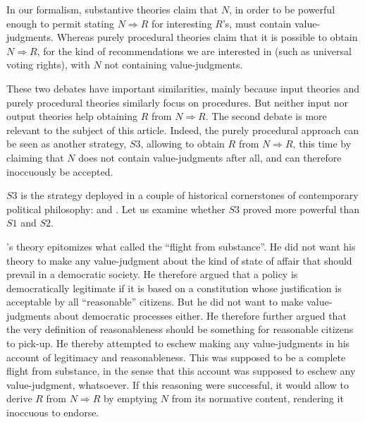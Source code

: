 \documentclass[preprint, french, english, 11pt, authoryear]{elsarticle}%
\begin{document}
In our formalism, substantive theories claim that $N$, in order to be powerful enough to permit stating $N ⇒ R$ for interesting $R$’s, must contain value-judgments. Whereas purely procedural theories claim that it is possible to obtain $N ⇒ R$, for the kind of recommendations we are interested in (such as universal voting rights), with $N$ not containing value-judgments. 

These two debates have important similarities, mainly because input theories and purely procedural theories similarly focus on procedures.  But neither input nor output theories help obtaining $R$ from $N ⇒ R$. The second debate is more relevant to the subject of this article. Indeed, the purely procedural approach can be seen as another strategy, $S3$, allowing to obtain $R$ from $N ⇒ R$, this time by claiming that $N$ does not contain value-judgments after all, and can therefore inoccuously be accepted.

$S3$ is the strategy deployed in a couple of historical cornerstones of contemporary political philosophy: \cite{rawls_political_2005} and \cite{habermas_moralbewustsein_1983}. Let us examine whether $S3$ proved more powerful than $S1$ and $S2$.

\cite{rawls_political_2005}'s theory epitomizes what \cite{estlund_democratic_2009} called the ``flight from substance''. He did not want his theory to make any value-judgment about the kind of state of affair that should prevail in a democratic society. He therefore argued that a policy is democratically legitimate if it is based on a constitution whose justification is acceptable by all  ``reasonable'' citizens. But he did not want to make value-judgments about democratic processes either. He therefore further argued that the very definition of reasonableness should be something for reasonable citizens to pick-up. He thereby attempted to eschew making any value-judgments in his account of legitimacy and reasonableness. This was supposed to be a complete flight from substance, in the sense that this account was supposed to eschew any value-judgment, whatsoever. If this reasoning were successful, it would allow to derive $R$ from $N ⇒ R$ by emptying $N$ from its normative content, rendering it inoccuous to endorse.
\end{document}

